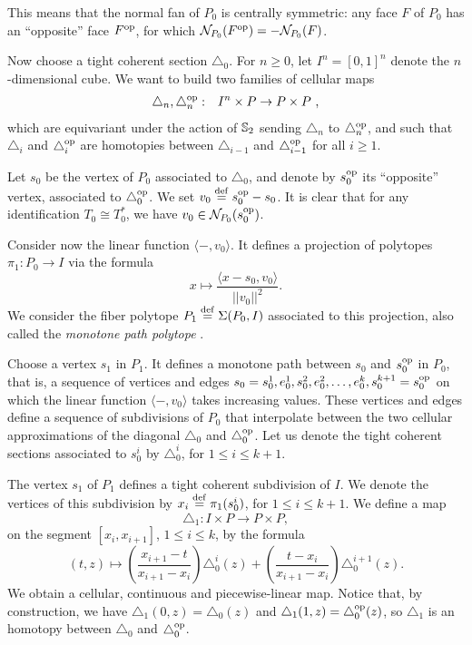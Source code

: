 This means that the normal fan of $P_0$ is centrally symmetric: any face $F$ of $P_0$ has an ``opposite'' face $F^{\mathrm{op}}$, for which $\mathcal{N}_{P_0}(F^{\mathrm{op}}) = -\mathcal{N}_{P_0}(F)$.

Now choose a tight coherent section $\triangle_0$.
For $n\geq 0$, let $I^n=[0,1]^n$ denote the $n$-dimensional cube.
We want to build two families of cellular maps
\begin{eqnarray*}
\triangle_n, \triangle^{\mathrm{op}}_n & : & I^n \times P \to P \times P  \ ,
\end{eqnarray*}
which are equivariant under the action of $\mathbb{S}_2$ sending $\triangle_n$ to $\triangle^{\mathrm{op}}_n$, and such that $\triangle_i$ and $\triangle_i^{\mathrm{op}}$ are homotopies between $\triangle_{i-1}$ and $\triangle_{i-1}^{\mathrm{op}}$ for all $i \geq 1$.

Let $s_0$ be the vertex of $P_0$ associated to $\triangle_0$, and denote by $s_0^{\mathrm{op}}$ its ``opposite'' vertex, associated to $\triangle_0^{\mathrm{op}}$. We set $v_0 \stackrel{\mathrm{def}}{=} s_0^{\mathrm{op}}-s_0$. It is clear that for any identification $T_0 \cong T_0^{*}$, we have $v_0 \in \mathcal{N}_{P_0}(s_0^{\mathrm{op}})$.

Consider now the linear function $\langle - , v_0 \rangle$.
It defines a projection of polytopes $\pi_1 \colon P_0 \to I$ via the formula
\[
x \mapsto \frac{\langle x-s_0, v_0 \rangle}{||v_0||^2}.
\]
We consider the fiber polytope $P_1 \stackrel{\mathrm{def}}{=} \Sigma(P_0,I)$ associated to this projection, also called the \emph{monotone path polytope} \cite[Chapter 9]{Ziegler95}.

Choose a vertex $s_1$ in $P_1$.
It defines a monotone path between $s_0$ and $s^{\mathrm{op}}_0$ in $P_0$, that is, a sequence of vertices and edges $s_0 = s_0^1, e_0^1, s_0^2, e_0^2, \dots, e_0^k, s_0^{k+1} = s^{\mathrm{op}}_0$ on which the linear function $\langle - , v_0 \rangle$ takes increasing values.
These vertices and edges define a sequence of subdivisions of $P_0$ that interpolate between the two cellular approximations of the diagonal $\triangle_0$ and $\triangle^{\mathrm{op}}_0$.
Let us denote the tight coherent sections associated to $s_0^i$ by $\triangle_0^i$, for $1 \leq i \leq k+1$.

The vertex $s_1$ of $P_1$ defines a tight coherent subdivision of $I$.
We denote the vertices of this subdivision by $x_i \stackrel{\mathrm{def}}{=} \pi_1(s_0^i)$, for $1 \leq i \leq k+1$.
We define a map
\[
\triangle_1 \colon I \times P \to P \times P,
\]
on the segment $[x_i, x_{i+1}]$, $1 \leq i \leq k$, by the formula
\[
(t,z) \mapsto \left( \frac{x_{i+1}-t}{x_{i+1}-x_i} \right) \triangle_0^{i}(z) + \left( \frac{t-x_{i}}{x_{i+1}-x_i} \right) \triangle_0^{i+1}(z).
\]
We obtain a cellular, continuous and piecewise-linear map.
Notice that, by construction, we have $\triangle_1(0,z)=\triangle_0(z)$ and $\triangle_1(1,z)=\triangle_0^{\mathrm{op}}(z)$, so $\triangle_1$ is an homotopy between $\triangle_0$ and $\triangle_0^{\mathrm{op}}$.

